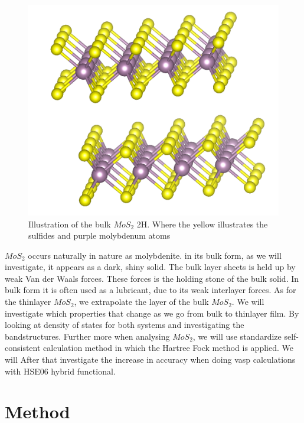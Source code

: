 \documentclass[twoside,onecolumn]{article}
\begin{document}
\begin{figure}[H]
\centerline{\includegraphics[scale= 0.46]{Pictures/MoS2.png}}
\caption{Illustration of the bulk $MoS_2$ 2H. Where the yellow illustrates the sulfides and purple molybdenum atoms}
\label{fig:MoS2}
\end{figure}

$MoS_2$ occurs naturally in nature as molybdenite. in its bulk form, as we will investigate, it appears as a dark, shiny solid. The bulk layer sheets is held up by weak Van der Waals forces. These forces is the holding stone of the bulk solid. In bulk form it is often used as a lubricant, due to its weak interlayer forces. As for the thinlayer $MoS_2$, we extrapolate the layer of the bulk $MoS_2$. We will investigate which properties that change as we go from bulk to thinlayer film. By looking at density of states for both systems and investigating the bandstructures. Further more when analysing $MoS_2$, we will use standardize self-consistent calculation method in which the Hartree Fock method is applied. We will After that investigate the increase in accuracy when doing vasp calculations with HSE06 hybrid functional. 


\section{Method}
\end{document}
